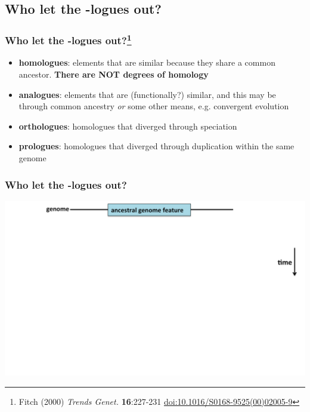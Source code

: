 
\subsection{Who let the -logues out?}

\begin{frame}
  \frametitle{Who let the -logues out?\footnote{\tiny{Fitch (2000) \textit{Trends Genet.} \textbf{16}:227-231 \href{http://dx.doi.org/10.1016/S0168-9525(00)02005-9}{doi:10.1016/S0168-9525(00)02005-9}}}}
    \begin{itemize}
      \item \textbf{homologues}: elements that are similar because they share a common ancestor. \textbf{There are NOT degrees of homology}
      \item \textbf{analogues}: elements that are (functionally?) similar, and this may be through common ancestry \textit{or} some other means, e.g. convergent evolution
      \item \textbf{orthologues}: homologues that diverged through speciation
      \item \textbf{prologues}: homologues that diverged through duplication within the same genome
    \end{itemize}
\end{frame}

\begin{frame}
  \frametitle{Who let the -logues out?}
  \begin{center}
    \includegraphics[width=1\textwidth]{images/logues1}  
  \end{center}  
\end{frame}

